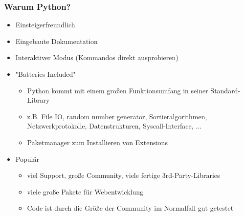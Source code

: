 \documentclass{beamer}
\begin{document}
\begin{frame}
\frametitle {Warum Python?}
\begin{itemize}
	\item Einsteigerfreundlich
	\item Eingebaute Dokumentation
	\item Interaktiver Modus (Kommandos direkt ausprobieren)

	\item "Batteries Included"
	\begin{itemize}
		\item Python kommt mit einem großen Funktionsumfang in seiner Standard-Library
		\item z.B. File IO, random number generator,
			Sortieralgorithmen, Netzwerkprotokolle,
			Datenstrukturen, Syscall-Interface, ...
		\item Paketmanager zum Installieren von Extensions
	\end{itemize}

	\item Populär
	\begin{itemize}
		\item viel Support, große Community, viele fertige 3rd-Party-Libraries
		\item viele große Pakete für Webentwicklung
		\item Code ist durch die Größe der Community im Normalfall gut getestet
	\end{itemize}

\end{itemize}
\end{frame}
\end{document}
